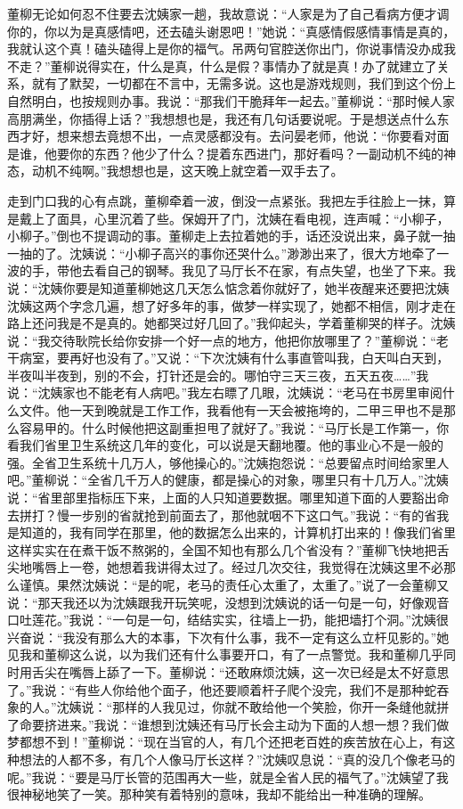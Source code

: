 \documentclass[12pt,oneside]{book}
\begin{document}
董柳无论如何忍不住要去沈姨家一趟，我故意说：``人家是为了自己看病方便才调你的，你以为是真感情吧，还去磕头谢恩吧！''她说：``真感情假感情事情是真的，我就认这个真！磕头磕得上是你的福气。吊两句官腔送你出门，你说事情没办成我不走？''董柳说得实在，什么是真，什么是假？事情办了就是真！办了就建立了关系，就有了默契，一切都在不言中，无需多说。这也是游戏规则，我们到这个份上自然明白，也按规则办事。我说：``那我们干脆拜年一起去。''董柳说：``那时候人家高朋满坐，你插得上话？''我想想也是，我还有几句话要说呢。于是想送点什么东西才好，想来想去竟想不出，一点灵感都没有。去问晏老师，他说：``你要看对面是谁，他要你的东西？他少了什么？提着东西进门，那好看吗？一副动机不纯的神态，动机不纯啊。''我想想也是，这天晚上就空着一双手去了。

走到门口我的心有点跳，董柳牵着一波，倒没一点紧张。我把左手往脸上一抹，算是戴上了面具，心里沉着了些。保姆开了门，沈姨在看电视，连声喊：``小柳子，小柳子。''倒也不提调动的事。董柳走上去拉着她的手，话还没说出来，鼻子就一抽一抽的了。沈姨说：``小柳子高兴的事你还哭什么。''渺渺出来了，很大方地牵了一波的手，带他去看自己的钢琴。我见了马厅长不在家，有点失望，也坐了下来。我说：``沈姨你要是知道董柳她这几天怎么惦念着你就好了，她半夜醒来还要把沈姨沈姨这两个字念几遍，想了好多年的事，做梦一样实现了，她都不相信，刚才走在路上还问我是不是真的。她都哭过好几回了。''我仰起头，学着董柳哭的样子。沈姨说：``我交待耿院长给你安排一个好一点的地方，他把你放哪里了？''董柳说：``老干病室，要再好也没有了。''又说：``下次沈姨有什么事直管叫我，白天叫白天到，半夜叫半夜到，别的不会，打针还是会的。哪怕守三天三夜，五天五夜\ldots\ldots{}''我说：``沈姨家也不能老有人病吧。''我左右瞟了几眼，沈姨说：``老马在书房里审阅什么文件。他一天到晚就是工作工作，我看他有一天会被拖垮的，二甲三甲也不是那么容易甲的。什么时候他把这副重担甩了就好了。''我说：``马厅长是工作第一，你看我们省里卫生系统这几年的变化，可以说是天翻地覆。他的事业心不是一般的强。全省卫生系统十几万人，够他操心的。''沈姨抱怨说：``总要留点时间给家里人吧。''董柳说：``全省几千万人的健康，都是操心的对象，哪里只有十几万人。''沈姨说：``省里部里指标压下来，上面的人只知道要数据。哪里知道下面的人要豁出命去拼打？慢一步别的省就抢到前面去了，那他就咽不下这口气。''我说：``有的省我是知道的，我有同学在那里，他的数据怎么出来的，计算机打出来的！像我们省里这样实实在在煮干饭不熬粥的，全国不知也有那么几个省没有？''董柳飞快地把舌尖地嘴唇上一卷，她想着我讲得太过了。经过几次交往，我觉得在沈姨这里不必那么谨慎。果然沈姨说：``是的呢，老马的责任心太重了，太重了。''说了一会董柳又说：``那天我还以为沈姨跟我开玩笑呢，没想到沈姨说的话一句是一句，好像观音口吐莲花。''我说：``一句是一句，结结实实，往墙上一扔，能把墙打个洞。''沈姨很兴奋说：``我没有那么大的本事，下次有什么事，我不一定有这么立杆见影的。''她见我和董柳这么说，以为我们还有什么事要开口，有了一点警觉。我和董柳几乎同时用舌尖在嘴唇上舔了一下。董柳说：``还敢麻烦沈姨，这一次已经是太不好意思了。''我说：``有些人你给他个面子，他还要顺着杆子爬个没完，我们不是那种蛇吞象的人。''沈姨说：``那样的人我见过，你就不敢给他一个笑脸，你开一条缝他就拼了命要挤进来。''我说：``谁想到沈姨还有马厅长会主动为下面的人想一想？我们做梦都想不到！''董柳说：``现在当官的人，有几个还把老百姓的疾苦放在心上，有这种想法的人都不多，有几个人像马厅长这样？''沈姨叹息说：``真的没几个像老马的呢。''我说：``要是马厅长管的范围再大一些，就是全省人民的福气了。''沈姨望了我很神秘地笑了一笑。那种笑有着特别的意味，我却不能给出一种准确的理解。
\end{document}
